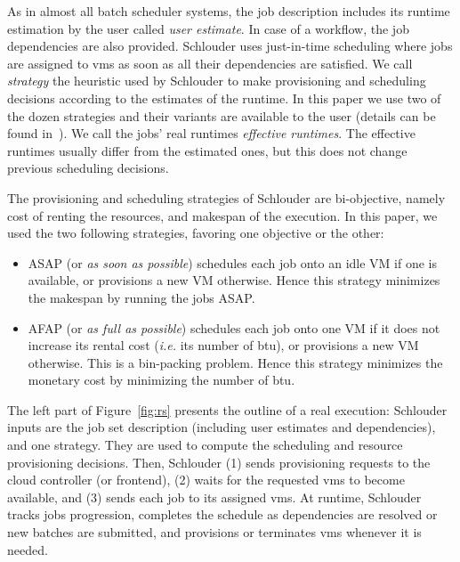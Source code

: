\documentclass[10pt,conference,compsocconf]{IEEEtran}
\begin{document}
As  in almost  all batch  scheduler systems,  the job  description includes  its
runtime  estimation by  the  user called  \emph{user estimate}.   In  case of  a
workflow, the job  dependencies are also provided.   Schlouder uses just-in-time
scheduling where jobs are assigned to \acp{vm} as soon as all their dependencies
are satisfied.  We call \emph{strategy} the  heuristic used by Schlouder to make
provisioning and  scheduling decisions according to the estimates of the runtime.  
In this paper we use two of the dozen strategies and  their variants
are available to  the user (details can be found  in~\cite{GenaudG11}). 
We call  the jobs'  real
runtimes \emph{effective  runtimes}. The effective runtimes usually differ from
the estimated ones, but this does not change previous scheduling decisions.

The provisioning and scheduling strategies of Schlouder are bi-objective, namely  
cost of renting the resources, and makespan of the execution.  In this paper, 
we used the two following strategies, favoring one objective or the other:
\begin{itemize}
\item ASAP (or \textit{as soon as possible}) schedules each job onto
  an idle VM if one is available, or provisions a new VM otherwise.
  Hence this strategy minimizes the makespan by running the jobs ASAP.

\item AFAP (or \textit{as full as  possible}) schedules each job onto
  one VM if it does not increase its rental cost (\textit{i.e.} its number
  of \ac{btu}), or provisions a new VM otherwise. This is a bin-packing problem.
  Hence this strategy minimizes the monetary cost by minimizing the number of \ac{btu}.
\end{itemize}

The left part  of Figure~\ref{fig:rs} presents the outline of  a real execution:
Schlouder inputs are the  job set description (including  user estimates and dependencies),  
and one strategy. They are used to compute   the   scheduling   and  resource   provisioning
decisions. Then, Schlouder (1) sends provisioning requests to the cloud controller (or frontend), 
(2) waits for the requested \acp{vm} to become available, and (3) sends  each  job to  its
assigned \acp{vm}. At runtime, Schlouder tracks jobs progression, completes the schedule as
dependencies are  resolved or new batches are submitted, and provisions or terminates \acp{vm}
whenever it is needed.
\end{document}
